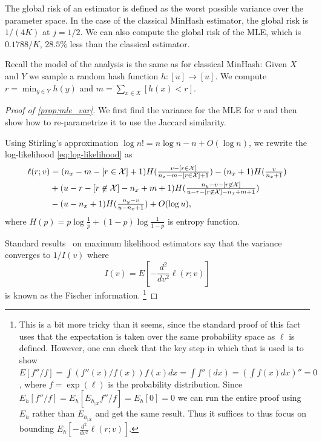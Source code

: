 The global risk of an estimator is defined as the worst possible variance over the parameter space.
In the case of the classical MinHash estimator, the global risk is $1/(4K)$ at $j=1/2$.
We can also compute the global risk of the MLE, which is $0.1788/K$, $28.5\%$ less than the classical estimator.

\smallskip

Recall the model of the analysis is the same as for classical MinHash:
Given $X$ and $Y$ we sample a random hash function $h:[u]\to[u]$.
We compute $r=\min_{y\in Y}h(y)$ and $m=\sum_{x\in X}[h(x)<r]$.

\begin{proof}[Proof of \cref{prop:mle_var}]
   We first find the variance for the MLE for $v$ and then show how to re-parametrize it to use the Jaccard similarity.

   Using Stirling's approximation $ \log n! = n\log n - n + O(\log n)$,
   we rewrite the log-likelihood \cref{eq:log-likelihood} as
   \begin{align}
      \ell(r;v) &=
      (n_x-m-[r\in\X]+1)H(\tfrac{v-[r\in\X]}{n_x-m-[r\in\X]+1})
               - (n_x+1) H(\tfrac{v}{n_x+1})
              \\&+(u-r-[r\not\in\X]-n_x+m+1) H(\tfrac{n_y-v-[r\not\in\X]}{u-r-[r\not\in\X]-n_x+m+1})
              \\& -(u-n_x+1) H(\tfrac{n_y-v}{u-n_x+1})
   + O(\log u), %
   \end{align}
   where $H(p)=p \log \frac{1}{p} + (1-p)\log \frac{1}{1-p}$ is entropy function.

   Standard results~\cite{panchenko2016lec3} on maximum likelihood estimators say that
   the variance converges to $1/I(v)$ where
   \[
      I(v) = E\left[-\frac{d^2}{dv^2}\ell(r; v)\right]
   \]
   is known as the Fischer information.
   \footnote{This is a bit more tricky than it seems, since
      the standard proof of this fact~\cite{panchenko2016lec3} uses that the expectation is taken over the same probability space as $\ell$ is defined.
      However, one can check that the key step in which that is used is to show
      $E[f''/f] = \int (f''(x)/f(x))f(x)dx = \int f''(dx) = (\int f(x)dx)'' = 0$, where $f=\exp(\ell)$ is the probability distribution.
      Since $E_h[f''/f] = E_h[E_{h_{|\overline X}}f''/f] = E_h[0]= 0$
      we can run the entire proof using $E_h$ rather than $E_{h_{|\overline X}}$ and get the same result.
      Thus it suffices to thus focus on bounding $E_h[-\frac{d^2}{dv^2}\ell(r;v)]$.
   }


\end{proof}
